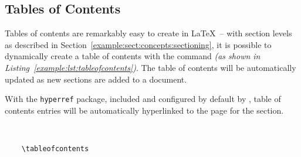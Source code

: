 \subsection{Tables of Contents}
Tables of contents are remarkably easy to create in \LaTeX\ -- with section levels as described in Section~\ref{example:sect:concepts:sectioning}, it is possible to dynamically create a table of contents with the  command \textit{(as shown in Listing~\ref{example:lst:tableofcontents})}. The table of contents will be automatically updated as new sections are added to a document.

With the \texttt{hyperref} package, included and configured by default by \uswdwmspkg{}, table of contents entries will be automatically hyperlinked to the page for the section.

\begin{listing}[H]
  \captionsetup{skip=\skiplistingcaptionlen}
  \begin{verbatim}
    
    
    \tableofcontents
  \end{verbatim}
  \caption{\LaTeX\ \texttt{\textbackslash tableofcontents} command example}
  \label{example:lst:tableofcontents}
\end{listing}

